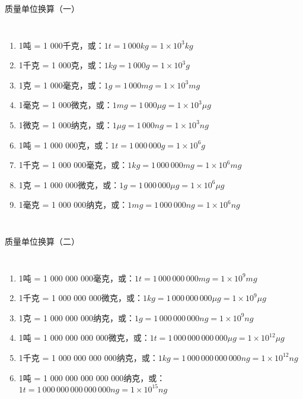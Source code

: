 \documentclass[aspectratio=169]{ctexbeamer} %
\begin{document}
\begin{frame}[t]{质量单位换算（一）}
\begin{columns}
\begin{enumerate}[label={\Alph*.}]
\item 1吨 = 1 000千克，或：$1 t = 1 \, 000 kg = 1 \times 10^{3} kg$ \pause
\item 1千克 = 1 000克，或：$1 kg = 1 \, 000 g = 1 \times 10^{3} g$ \pause
\item 1克 = 1 000毫克，或：$1 g = 1 \, 000 mg = 1 \times 10^{3} mg$ \pause
\item 1毫克 = 1 000微克，或：$1 mg = 1 \, 000 \mu g = 1 \times 10^{3} \mu g$ \pause
\item 1微克 = 1 000纳克，或：$1 \mu g = 1 \, 000 ng = 1 \times 10^{3} ng$ \pause
\item 1吨 = 1 000 000克，或：$1 t = 1 \, 000 \, 000 g = 1 \times 10^{6} g$ \pause
\item 1千克 = 1 000 000毫克，或：$1 kg = 1 \, 000 \, 000 mg = 1 \times 10^{6} mg$ \pause
\item 1克 = 1 000 000微克，或：$1 g = 1 \, 000 \, 000 \mu g = 1 \times 10^{6} \mu g$ \pause
\item 1毫克 = 1 000 000纳克，或：$1 mg = 1 \, 000 \, 000 ng = 1 \times 10^{6} ng$ \pause
\pause
\end{enumerate}
\end{columns}
\end{frame}

\begin{frame}[t]{质量单位换算（二）}
\begin{columns}
\begin{enumerate}[label={\Alph*.}]
\item 1吨 = 1 000 000 000毫克，或：$1 t = 1 \, 000 \, 000 \, 000 mg = 1 \times 10^{9} mg$ \pause
\item 1千克 = 1 000 000 000微克，或：$1 kg = 1 \, 000 \, 000 \, 000 \mu g = 1 \times 10^{9} \mu g$ \pause
\item 1克 = 1 000 000 000纳克，或：$1 g = 1 \, 000 \, 000 \, 000 ng = 1 \times 10^{9} ng$ \pause
\item 1吨 = 1 000 000 000 000微克，或：$1 t = 1 \, 000 \, 000 \, 000 \, 000 \mu g = 1 \times 10^{12} \mu g$ \pause
\item 1千克 = 1 000 000 000 000纳克，或：$1 kg = 1 \, 000 \, 000 \, 000 \, 000 ng = 1 \times 10^{12} ng$ \pause
\item 1吨 = 1 000 000 000 000 000纳克，或：$1 t = 1 \, 000 \, 000 \, 000 \, 000 \, 000 ng = 1 \times 10^{15} ng$ 
\pause
\end{enumerate}
\end{columns}
\end{frame}
\end{document}
